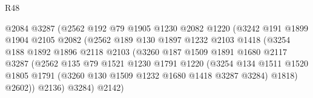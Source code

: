 \begin{lexlean}{R48}
\begin{coremodule}
                                  @2084
                                  @3287
                                  (@2562
                                    @192
                                    @79
                                    @1905
                                    @1230
                                    @2082
                                    @1220
                                    (@3242
                                      @191
                                      @1899
                                      @1904
                                      @2105
                                      @2082
                                      (@2562
                                        @189
                                        @130
                                        @1897
                                        @1232
                                        @2103
                                        @1418
                                        (@3254
                                          @188
                                          @1892
                                          @1896
                                          @2118
                                          @2103
                                          (@3260
                                            @187
                                            @1509
                                            @1891
                                            @1680
                                            @2117
                                            @3287
                                            (@2562
                                              @135
                                              @79
                                              @1521
                                              @1230
                                              @1791
                                              @1220
                                              (@3254
                                                @134
                                                @1511
                                                @1520
                                                @1805
                                                @1791
                                                (@3260 @130 @1509 @1232 @1680 @1418 @3287 @3284)
                                                @1818)
                                              @2602))
                                          @2136)
                                        @3284)
                                      @2142)

\end{coremodule}
\end{lexlean}
